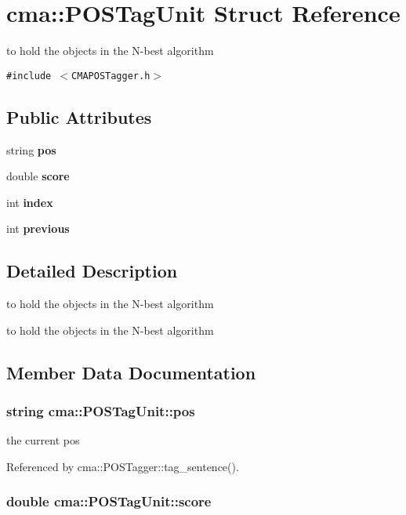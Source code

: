 \section{cma::POSTagUnit Struct Reference}
\label{structcma_1_1POSTagUnit}
to hold the objects in the N-best algorithm  


{\tt \#include $<$CMAPOSTagger.h$>$}

\subsection*{Public Attributes}
\begin{CompactItemize}
\item 
string {\bf pos}
\item 
double {\bf score}
\item 
int {\bf index}
\item 
int {\bf previous}
\end{CompactItemize}


\subsection{Detailed Description}
to hold the objects in the N-best algorithm 

to hold the objects in the N-best algorithm 

\subsection{Member Data Documentation}
\subsubsection{\setlength{\rightskip}{0pt plus 5cm}string {\bf cma::POSTagUnit::pos}}\label{structcma_1_1POSTagUnit_695dce4497a36b42431d5506fdccf30e}


the current pos 

Referenced by cma::POSTagger::tag\_\-sentence().
\subsubsection{\setlength{\rightskip}{0pt plus 5cm}double {\bf cma::POSTagUnit::score}}\label{structcma_1_1POSTagUnit_8256b2cd6fab35e40cc1bc2dd3b39ce2}


